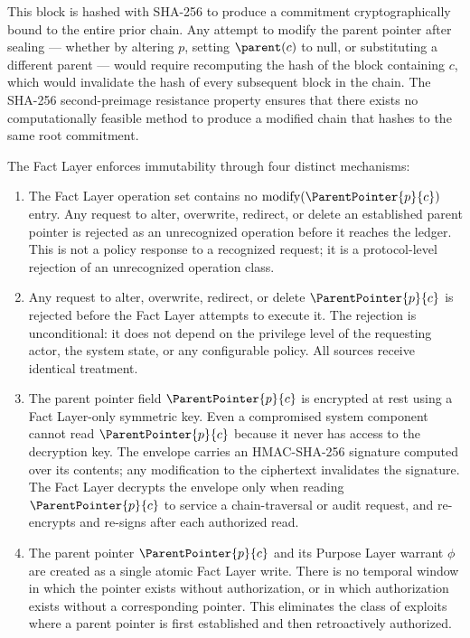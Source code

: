 This block is hashed with SHA-256 to produce a commitment cryptographically bound to the entire prior chain. Any attempt to modify the parent pointer after sealing — whether by altering $p$, setting $\parent(c)$ to null, or substituting a different parent — would require recomputing the hash of the block containing $c$, which would invalidate the hash of every subsequent block in the chain. The SHA-256 second-preimage resistance property ensures that there exists no computationally feasible method to produce a modified chain that hashes to the same root commitment.

The Fact Layer enforces immutability through four distinct mechanisms:

\begin{enumerate}
    \item[(W1) \textbf{No modification operation defined.}] The Fact Layer operation set contains no $\mathrm{modify}(\ParentPointer{p}{c})$ entry. Any request to alter, overwrite, redirect, or delete an established parent pointer is rejected as an unrecognized operation before it reaches the ledger. This is not a policy response to a recognized request; it is a protocol-level rejection of an unrecognized operation class.

    \item[(W2) \textbf{Unconditional rejection.}] Any request to alter, overwrite, redirect, or delete $\ParentPointer{p}{c}$ is rejected before the Fact Layer attempts to execute it. The rejection is unconditional: it does not depend on the privilege level of the requesting actor, the system state, or any configurable policy. All sources receive identical treatment.

    \item[(W3) \textbf{Sealed memory envelope.}] The parent pointer field $\ParentPointer{p}{c}$ is encrypted at rest using a Fact Layer-only symmetric key. Even a compromised system component cannot read $\ParentPointer{p}{c}$ because it never has access to the decryption key. The envelope carries an HMAC-SHA-256 signature computed over its contents; any modification to the ciphertext invalidates the signature. The Fact Layer decrypts the envelope only when reading $\ParentPointer{p}{c}$ to service a chain-traversal or audit request, and re-encrypts and re-signs after each authorized read.

    \item[(W4) \textbf{Atomic provisioning.}] The parent pointer $\ParentPointer{p}{c}$ and its Purpose Layer warrant $\phi$ are created as a single atomic Fact Layer write. There is no temporal window in which the pointer exists without authorization, or in which authorization exists without a corresponding pointer. This eliminates the class of exploits where a parent pointer is first established and then retroactively authorized.
\end{enumerate}

